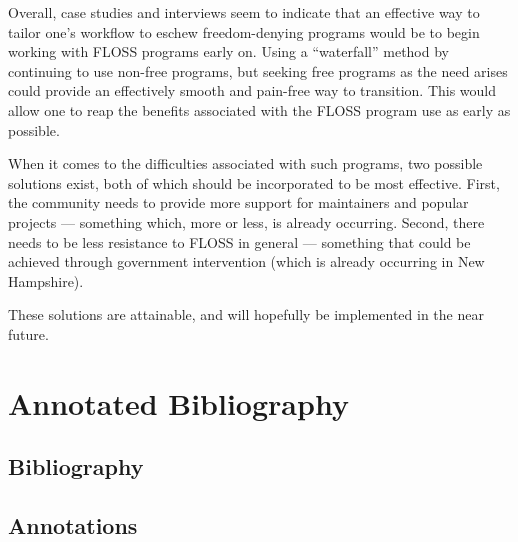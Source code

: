 \documentclass[conference]{IEEEtran}
\begin{document}
Overall, case studies and interviews seem to indicate that an effective way to tailor one's workflow to eschew freedom-denying programs would be to begin working with FLOSS programs early on. Using a ``waterfall'' method by continuing to use non-free programs, but seeking free programs as the need arises could provide an effectively smooth and pain-free way to transition. This would allow one to reap the benefits associated with the FLOSS program use as early as possible.

When it comes to the difficulties associated with such programs, two possible solutions exist, both of which should be incorporated to be most effective. First, the community needs to provide more support for maintainers and popular projects — something which, more or less, is already occurring. Second, there needs to be less resistance to FLOSS in general — something that could be achieved through government intervention (which is already occurring in New Hampshire). 

These solutions are attainable, and will hopefully be implemented in the near future.

\section{Annotated Bibliography}

\subsection{Bibliography}



\subsection{Annotations}
\end{document}
